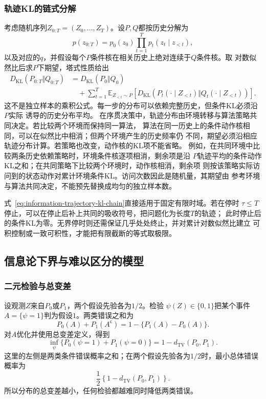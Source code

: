 \subsubsection{轨迹KL的链式分解}
考虑随机序列\(Z_{0:T}=(Z_0,\ldots,Z_T)\)。设\(P,Q\)都按历史分解为
\[
  p(z_{0:T})
  =
  p_0(z_0)\prod_{t=1}^{T}p_t(z_t\mid z_{<t}),
\]
以及对应的\(q\)，并假设每个\(P\)条件核在相关历史上绝对连续于\(Q\)条件核。取
对数似然比后求\(P\)下期望，塔式性质给出
\begin{equation}
\begin{aligned}
  D_{\mathrm{KL}}(P_{0:T}\Vert Q_{0:T})
  &=
  D_{\mathrm{KL}}(P_0\Vert Q_0)\\
  &\quad+
  \sum_{t=1}^{T}
  \mathbb{E}_{Z_{<t}\sim P}
  \left[
    D_{\mathrm{KL}}\!\left(
      P_t(\cdot\mid Z_{<t})
      \Vert
      Q_t(\cdot\mid Z_{<t})
    \right)
  \right].
  \label{eq:information-trajectory-kl-chain}
\end{aligned}
\end{equation}
这不是独立样本的乘积公式。每一步的分布可以依赖完整历史，但条件KL必须沿\(P\)实际
诱导的历史分布平均。
在序贯决策中，轨迹分布由环境转移与算法策略共同决定。若比较两个环境而保持同一算法，
算法在同一历史上的条件动作核相同，可以在似然比中相消；但两个环境产生的历史频率仍
不同，期望必须沿相应轨迹分布计算。若策略也改变，动作核的KL项不能省略。
例如，在共同环境中比较两条历史依赖策略时，环境条件核逐项相消，剩余项是沿
\(P\)轨迹平均的条件动作KL之和；在共同策略下比较两个环境时，动作核相消，剩余项
则按该策略实际访问到的状态动作对累计环境条件KL。访问次数因此是随机量，其期望由
参考环境与算法共同决定，不能预先替换成均匀的独立样本数。

式~\eqref{eq:information-trajectory-kl-chain}直接适用于固定有限时域。若在停时
\(\tau\leq T\)停止，可以在停止后补上共同的吸收符号，把问题化为长度\(T\)的轨迹；
此时停止后的条件KL为零。无界停时则还需保证几乎处处终止，并对累计对数似然比建立
可积控制或一致可积性，才能把有限截断的等式取极限。
\subsection{信息论下界与难以区分的模型}
\label{sec:information-lower-bounds}
\subsubsection{二元检验与总变差}
设观测\(Z\)来自\(P_0\)或\(P_1\)，两个假设先验各为\(1/2\)。检验
\(\psi(Z)\in\{0,1\}\)把某个事件\(A=\{\psi=1\}\)判为假设\(1\)。两类错误之和为
\[
  P_0(A)+P_1(A^{\mathsf c})
  =
  1-\{P_1(A)-P_0(A)\}.
\]
对\(A\)优化并使用总变差定义，得到
\begin{equation}
  \inf_\psi
  \{P_0(\psi=1)+P_1(\psi=0)\}
  =
  1-d_{\mathrm{TV}}(P_0,P_1).
  \label{eq:information-binary-testing-tv}
\end{equation}
这里的左侧是两类条件错误概率之和；在两个假设先验各为\(1/2\)时，最小总体错误概率为
\[
  \frac12\left\{1-d_{\mathrm{TV}}(P_0,P_1)\right\}.
\]
所以分布的总变差越小，任何检验都越难同时降低两类错误。
